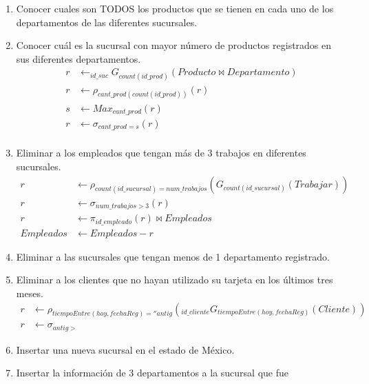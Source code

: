 \documentclass{article}
\begin{document}
\begin{enumerate}
{        }
        \item {
            Conocer cuales son TODOS los productos que se tienen en cada uno de
            los departamentos de las diferentes sucursales.
        }
        \item {
            Conocer cuál es la sucursal con mayor número de productos
            registrados en sus diferentes departamentos.
            \begin{align*}
            r &\leftarrow _{id\_suc}G_{count(id\_prod)}(Producto \bowtie Departamento)\\
            r &\leftarrow \rho_{cant\_prod(count(id\_prod))}(r)\\
            s &\leftarrow Max_{cant\_prod}(r)\\
            r &\leftarrow \sigma_{cant\_prod=s}(r)\\
            \end{align*}
        }
        \item {
            Eliminar a los empleados que tengan más de 3 trabajos en diferentes 
            sucursales.
            \begin{align*}
                r &\leftarrow \rho_{count(id\_sucursal) = num\_trabajos}
                (G_{count(id\_sucursal)}(Trabajar))\\
                r &\leftarrow \sigma_{num\_trabajos > 3} (r) \\
                r &\leftarrow \pi_{id\_empleado}(r) \bowtie Empleados\\
                Empleados &\leftarrow Empleados - r
            \end{align*}
        }
        \item {
            Eliminar a las sucursales que tengan menos de 1 departamento
            registrado.
        }
        \item {
            Eliminar a los clientes que no hayan utilizado su tarjeta en los
            últimos tres meses.
            \begin{align*}
                r &\leftarrow \rho_{tiempoEntre(hoy, fechaReg)=''antig}
                (_{id\_cliente}G_{tiempoEntre(hoy, fechaReg)}(Cliente)) \\
                r &\leftarrow \sigma_{antig >}
            \end{align*}
        }
        \item {
            Insertar una nueva sucursal en el estado de México.
        }
        \item {
            Insertar la información de 3 departamentos a la sucursal que fue
}
\end{enumerate}
\end{document}
